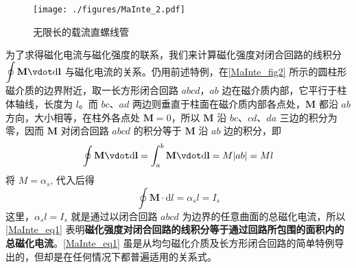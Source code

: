 \begin{figure}[ht]
\centering
\texttt{[image: ./figures/MaInte\_2.pdf]}
\caption{无限长的载流直螺线管} \label{MaInte_fig2}
\end{figure}
为了求得磁化电流与磁化强度的联系，我们来计算磁化强度对闭合回路的线积分 $\displaystyle \oint \mathbf M \vdot \mathrm{d} \mathbf l$ 与磁化电流的关系。仍用前述特例，在\autoref{MaInte_fig2} 所示的圆柱形磁介质的边界附近，取一长方形闭合回路 $abcd$，$ab $ 边在磁介质内部，它平行于柱体轴线，长度为 $l$。而 $bc$、$ad $ 两边则垂直于柱面在磁介质内部各点处，$\mathbf M$ 都沿 $ab $ 方向，大小相等，在柱外各点处 $\mathbf M=0$，所以 $\mathbf M $ 沿 $bc$、$cd$、$da $ 三边的积分为零，因而 $\mathbf M $ 对闭合回路 $abcd$ 的积分等于 $\mathbf M $ 沿 $ab $ 边的积分，即
\begin{equation}
\oint \mathbf{M}\vdot  \mathrm{d} \mathbf{l}=\int_{a}^{b} \mathbf{M} \vdot  \mathrm{d} \mathbf{l}=M|a b|=M l
\end{equation}
将 $M=\alpha_s$, 代入后得
\begin{equation} \label{MaInte_eq1}
\oint \mathbf M \cdot \mathrm{d} l=\alpha_{s} l=I_{s}
\end{equation}
这里，$\alpha_sl=I_s$ 就是通过以闭合回路 $abcd$ 为边界的任意曲面的总磁化电流，所以\autoref{MaInte_eq1} 表明\textbf{磁化强度对闭合回路的线积分等于通过回路所包围的面积内的总磁化电流}。\autoref{MaInte_eq1} 虽是从均匀磁化介质及长方形闭合回路的简单特例导出的，但却是在任何情况下都普遍适用的关系式。
